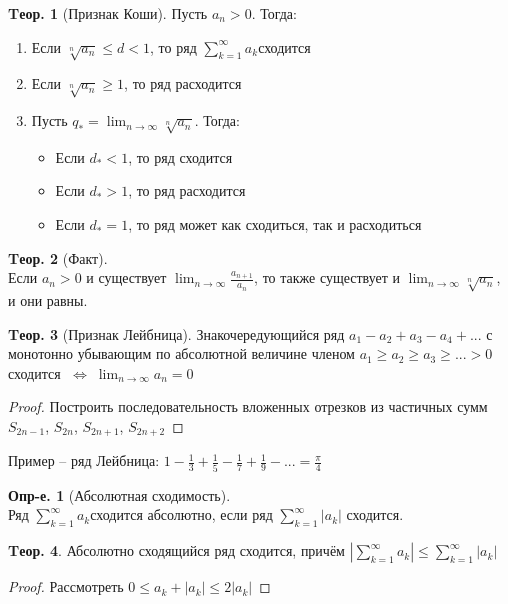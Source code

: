 \documentclass[a4paper,12pt]{article}
\numberwithin{figure}{section}
\theoremstyle{definition}
\newtheorem{definition}{Опр-е.}[section]
\theoremstyle{definition}
\newtheorem{theorem}{Tеор.}[section]
\def\DS{\displaystyle}
\def\ntoinf{n\to\infty}
\def\leqs{\leqslant}
\def\geqs{\geqslant}
\def\iff{$\;\Longleftrightarrow\;$}
\def\rowak{$\DS\sum_{k=1}^{\infty}a_k$\space}
\begin{document}
\begin{theorem}[Признак Коши]
	Пусть $a_n>0$. Тогда:
	\begin{enumerate}
		\item Если $\DS\sqrt[n]{a_n} \leqs d < 1$, то ряд \rowak сходится
		\item Если $\DS\sqrt[n]{a_n} \geqs 1$, то ряд расходится
		\item Пусть $\DS q_* = \lim_{\ntoinf} \sqrt[n]{a_n}$. Тогда:
		\begin{itemize}
			\item Если $d_* < 1$, то ряд сходится
			\item Если $d_* > 1$, то ряд расходится
			\item Если $d_* = 1$, то ряд может как сходиться, так и расходиться
		\end{itemize}
	\end{enumerate}
\end{theorem}

\begin{theorem}[Факт] \ \\
	Если $a_n>0$ и существует $\DS \lim_{\ntoinf} \frac{a_{n+1}}{a_n}$,
	то также существует и $\DS \lim_{\ntoinf} \sqrt[n]{a_n}$, и они равны.
\end{theorem}
\bigskip

\begin{theorem}[Признак Лейбница]
	Знакочередующийся ряд $a_1 - a_2 + a_3 - a_4 + ...$
	с монотонно убывающим по абсолютной величине членом
	$a_1 \geqs a_2 \geqs a_3 \geqs ... > 0$
	сходится \iff $\DS \lim_{\ntoinf} a_n = 0$
\end{theorem}
\begin{proof}
	Построить последовательность вложенных отрезков из частичных сумм
	$S_{2n-1}$, $S_{2n}$, $S_{2n+1}$, $S_{2n+2}$
\end{proof}
\bigskip

Пример -- ряд Лейбница: $\DS 1-\frac13+\frac15-\frac17+\frac19-... = \frac\pi4$
\bigskip


\begin{definition}[Абсолютная сходимость] \ \\
	Ряд \rowak сходится абсолютно,
	если ряд $\DS\sum_{k=1}^{\infty}|a_k|$ сходится.
\end{definition}

\begin{theorem}
	Абсолютно сходящийся ряд сходится, причём
	$\DS \left|\sum_{k=1}^{\infty}a_k\right| \leqs \sum_{k=1}^{\infty}|a_k|$
\end{theorem}
\begin{proof} Рассмотреть $0 \leqs a_k + |a_k| \leqs 2|a_k|$ \end{proof}
\end{document}
